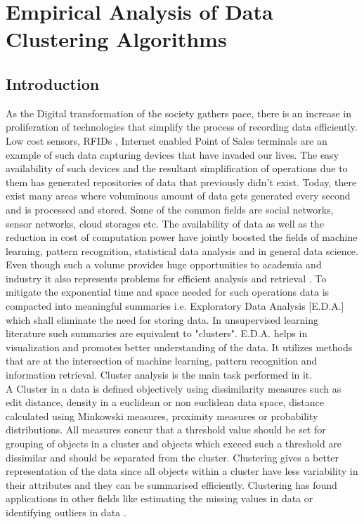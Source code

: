 
\chapter{Empirical Analysis of Data Clustering Algorithms}

\section{Introduction}
As the Digital transformation of the society gathers pace, there is an increase in proliferation of technologies that simplify the process of recording data efficiently. Low cost sensors, RFIDs , Internet enabled Point of Sales terminals are an example of such data capturing devices that have invaded our lives. The easy availability of such devices and the resultant simplification of operations due to them has generated repositories of data that previously didn't exist. Today, there exist many areas where voluminous amount of data gets generated every second and is processed and stored. Some of the common fields are social networks, sensor networks, cloud storages etc. The availability of data as well as the reduction in cost of computation power have jointly boosted the fields of machine learning, pattern recognition, statistical data analysis and in general data science.  \\

Even though such a volume provides huge opportunities to academia and industry it also represents problems for efficient analysis and retrieval \cite{aps:1} \cite{aps:3}. To mitigate the exponential time and space needed for such operations data is compacted into meaningful summaries i.e. Exploratory Data Analysis [E.D.A.] which shall eliminate the need for storing data. In unsupervised learning literature such summaries are equivalent to "clusters". E.D.A. helps in visualization and promotes better understanding of the data. It utilizes methods that are at the intersection of machine learning, pattern recognition and information retrieval. Cluster analysis is the main task performed in it.  \\

A Cluster in a data is defined objectively using dissimilarity measures such as edit distance, density in a euclidean or non euclidean data space, distance calculated using Minkowski measures, proximity measures or probability distributions. All measures concur that a threshold value should be set for grouping of objects in a cluster and objects which exceed such a threshold are dissimilar and should be separated from the cluster. Clustering gives a better representation of the data since all objects within a cluster have less variability in their attributes and they can be summarised efficiently. Clustering has found applications in other fields like estimating the missing values in data or identifying outliers in data \cite{aps:7}. 
\\


